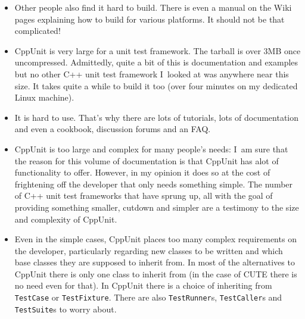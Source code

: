 \documentclass{book}
\begin{document}
\begin{itemize}
\item Other people also find it hard to build.
There is even a manual on the Wiki pages explaining how to
build for various platforms. It should not be that complicated!

\item CppUnit is very large for a unit test framework.
The tarball is over 3MB once uncompressed.
Admittedly, quite a bit of this is documentation and examples
but no other C++ unit test framework I~looked at was anywhere
near this size. It takes quite a while to build it too (over four
minutes on my dedicated Linux machine).

\item It is hard to use. That's why there are lots of tutorials,
lots of documentation and even a cookbook, discussion forums
and an FAQ. 

\item CppUnit is too large and complex for many people's needs:
I~am sure that the reason for this volume of
documentation is that CppUnit has alot of functionality to
offer. However, in my opinion it does so at the cost
of frightening off the developer that only needs something simple.
The number of C++ unit test frameworks that have sprung up,
all with the goal of providing something smaller, cutdown and simpler
are a testimony to the size and complexity of CppUnit.

\item Even in the simple cases, CppUnit places too many complex
requirements on the developer, particularly regarding new classes
to be written and which base classes they are supposed to inherit
from. In most of the alternatives to CppUnit there is only
one class to inherit from (in the case of CUTE there is no
need even for that). In CppUnit there is a choice of inheriting
from {\tt TestCase} or {\tt TestFixture}. 
There are also {\tt TestRunner}s,
{\tt TestCaller}s and {\tt TestSuite}s to worry about.
\end{itemize}

\end{document}
